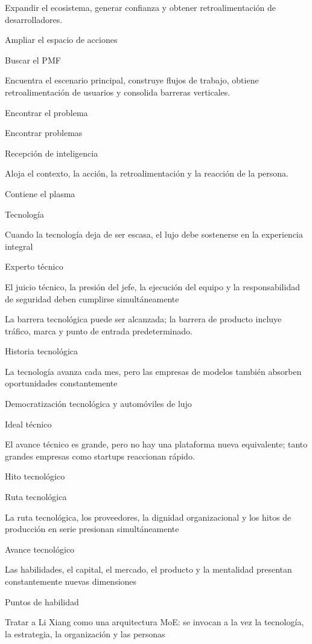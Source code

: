 \documentclass{article}
\begin{document}
Expandir el ecosistema, generar confianza y obtener retroalimentación de desarrolladores.

Ampliar el espacio de acciones

Buscar el PMF

Encuentra el escenario principal, construye flujos de trabajo, obtiene retroalimentación de usuarios y consolida barreras verticales.

Encontrar el problema

Encontrar problemas

Recepción de inteligencia

Aloja el contexto, la acción, la retroalimentación y la reacción de la persona.

Contiene el plasma

Tecnología

Cuando la tecnología deja de ser escasa, el lujo debe sostenerse en la experiencia integral

Experto técnico

El juicio técnico, la presión del jefe, la ejecución del equipo y la responsabilidad de seguridad deben cumplirse simultáneamente

La barrera tecnológica puede ser alcanzada; la barrera de producto incluye tráfico, marca y punto de entrada predeterminado.

Historia tecnológica

La tecnología avanza cada mes, pero las empresas de modelos también absorben oportunidades constantemente

Democratización tecnológica y automóviles de lujo

Ideal técnico

El avance técnico es grande, pero no hay una plataforma nueva equivalente; tanto grandes empresas como startups reaccionan rápido.

Hito tecnológico

Ruta tecnológica

La ruta tecnológica, los proveedores, la dignidad organizacional y los hitos de producción en serie presionan simultáneamente

Avance tecnológico

Las habilidades, el capital, el mercado, el producto y la mentalidad presentan constantemente nuevas dimensiones

Puntos de habilidad

Tratar a Li Xiang como una arquitectura MoE: se invocan a la vez la tecnología, la estrategia, la organización y las personas
\end{document}
